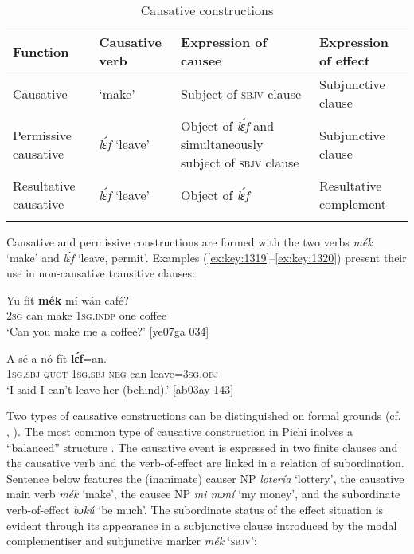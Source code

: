 \begin{table}
\caption{Causative constructions}
\label{tab:key:9.12}
\small
\begin{tabularx}{\textwidth}{XlQQ}
\lsptoprule

Function & Causative verb & Expression of causee & Expression of effect \\
\midrule
Causative &  ‘make’ & Subject of \textsc{sbjv} clause & Subjunctive clause \\
\tablevspace
Permissive causative & \textit{lɛ́f} ‘leave’ & Object of \textit{lɛ́f} and simultaneously subject of \textsc{sbjv} clause & Subjunctive clause \\
\tablevspace
Resultative causative & \textit{lɛ́f} ‘leave’ & Object of \textit{lɛ́f} & Resultative complement\\
\lspbottomrule
\end{tabularx}
\end{table}
Causative and permissive constructions are formed with the two verbs \textit{mék} ‘make’ and \textit{lɛ́f} ‘leave, permit’. Examples (\ref{ex:key:1319}–\ref{ex:key:1320}) present their use in non-causative transitive clauses:


\ea%
    \label{ex:key:1319}
    \gll Yu  fít  \textbf{mék}    mí    wán    café?\\
\textsc{2sg}  can  make  \textsc{1sg.indp}  one    coffee\\

\glt ‘Can you make me a coffee?’ [ye07ga 034]
\z


\ea%
    \label{ex:key:1320}
    \gll A    sé    a    nó  fít  \textbf{lɛ́f}=an.\\
\textsc{1sg.sbj}  \textsc{quot}    \textsc{1sg.sbj}  \textsc{neg}  can  leave=\textsc{3sg.obj}\\

\glt ‘I said I can’t leave her (behind).’ [ab03ay 143]
\z

Two types of causative constructions can be distinguished on formal grounds (cf. \citealt{Yakpo2012a}, \citealt{Yakpo2017a}). The most common type of causative construction in Pichi inolves a “balanced” structure \citep{Cristofaro2003}. The causative event is expressed in two finite clauses and the causative verb and the verb-of-effect are linked in a relation of subordination. Sentence  below features the (inanimate) causer NP \textit{lotería} ‘lottery’, the causative main verb \textit{mék} ‘make’, the causee NP \textit{mi mɔní} ‘my money’, and the subordinate verb-of-effect \textit{bɔkú} ‘be much’. The subordinate status of the effect situation is evident through its appearance in a subjunctive clause introduced by the modal complementiser and subjunctive marker \textit{mék} ‘\textsc{sbjv}’:


